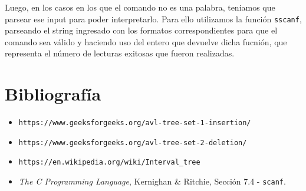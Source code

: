 \documentclass[11pt]{article}
\begin{document}
 Luego, en los casos en los que el comando no es una palabra, teniamos que parsear ese input para poder interpretarlo. Para ello utilizamos la función \verb|sscanf|, parseando el string ingresado con los formatos correspondientes para que el comando sea válido y haciendo uso del entero que devuelve dicha fucnión, que representa el número de lecturas exitosas que fueron realizadas. \par

 
 \section{Bibliografía}
 \begin{itemize}
     \item \verb|https://www.geeksforgeeks.org/avl-tree-set-1-insertion/|
     \item \verb|https://www.geeksforgeeks.org/avl-tree-set-2-deletion/|
     \item \verb|https://en.wikipedia.org/wiki/Interval_tree|
     \item \textit{The C Programming Language}, Kernighan \& Ritchie, Sección 7.4 - \verb|scanf|.
 \end{itemize}
 
\end{document}
